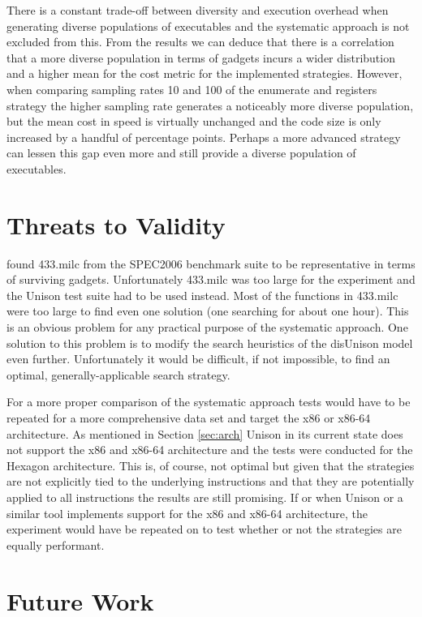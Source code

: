 There is a constant trade-off between diversity and execution overhead when generating
diverse populations of executables and the systematic approach is not excluded from this.
From the results we can deduce that there is a correlation that a more diverse population
in terms of gadgets incurs a wider distribution and a higher mean for the cost metric for
the implemented strategies. However, when comparing sampling rates 10 and 100 of the
enumerate and registers strategy the higher sampling rate generates a noticeably more
diverse population, but the mean cost in speed is virtually unchanged and the code size is
only increased by a handful of percentage points. Perhaps a more advanced strategy can
lessen this gap even more and still provide a diverse population of executables.

\section{Threats to Validity}

\textcite{large-scale-automated} found 433.milc from the SPEC2006 benchmark suite to be
representative in terms of surviving gadgets. Unfortunately 433.milc was too large for the
experiment and the Unison test suite had to be used instead. Most of the functions in
433.milc were too large to find even one solution (one searching for about one hour).
This is an obvious problem for any practical purpose of the systematic approach. One
solution to this problem is to modify the search heuristics of the disUnison model even
further. Unfortunately it would be difficult, if not impossible, to find an optimal,
generally-applicable search strategy.

For a more proper comparison of the systematic approach tests would have to be repeated for
a more comprehensive data set and target the x86 or x86-64 architecture. As mentioned in
Section \ref{sec:arch} Unison in its current state does not support the x86 and x86-64
architecture and the tests were conducted for the Hexagon architecture. This is, of course,
not optimal but given that the strategies are not explicitly tied to the underlying
instructions and that they are potentially applied to all instructions the results are
still promising. If or when Unison or a similar tool implements support for the x86 and
x86-64 architecture, the experiment would have be repeated on to test whether or not the
strategies are equally performant.

\section{Future Work}


